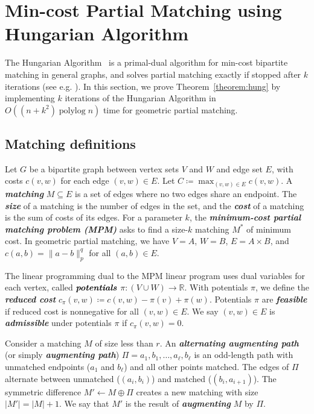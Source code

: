 \documentclass[a4paper,UKenglish]{socg-lipics-v2018}
\def\polylog{\mathop{\mathrm{polylog}}}
\def\reals{\mathbb{R}}
\def\abs#1{\mathopen| #1 \mathclose|}		%
\def\norm#1{\mathopen\| #1 \mathclose\|}	%
\theoremstyle{plain}
\numberwithin{figure}{section}
\def\EMPH#1{\textbf{\emph{\boldmath #1}}}
\begin{document}
\section{Min-cost Partial Matching using Hungarian Algorithm}
\label{section:hung}

The Hungarian Algorithm~\cite{Kuhn55} is a primal-dual algorithm for min-cost
bipartite matching in general graphs, and solves partial matching exactly if
stopped after $k$ iterations (see e.g. \cite{RT12}).
In this section, we prove Theorem~\ref{theorem:hung} by implementing $k$
iterations of the Hungarian Algorithm in $O((n + k^2)\polylog n)$ time for
geometric partial matching.

\subsection{Matching definitions}

Let $G$ be a bipartite graph between vertex sets $V$ and $W$ and edge set $E$,
with costs $c(v, w)$ for each edge $(v, w) \in E$.
Let $C \coloneqq \max_{(v, w) \in E} c(v, w)$.
A \EMPH{matching} $M \subseteq E$ is a set of edges where no two edges share an
endpoint.
The \EMPH{size} of a matching is the number of edges in the set, and the
\EMPH{cost} of a matching is the sum of costs of its edges.
For a parameter $k$, the \EMPH{minimum-cost partial matching problem (MPM)}
asks to find a size-$k$ matching $M^*$ of minimum cost.
In geometric partial matching, we have $V = A$, $W = B$, $E = A \times B$,
and $c(a, b) = \norm{a-b}_p^q$ for all $(a, b) \in E$.

The linear programming dual to the MPM linear program uses dual variables for
each vertex, called $\EMPH{potentials}$ $\pi: (V\cup W) \to \reals$.
With potentials $\pi$, we define the \EMPH{reduced cost}
$c_\pi(v, w) \coloneqq c(v, w) - \pi(v) + \pi(w)$.
Potentials $\pi$ are \EMPH{feasible} if reduced cost is nonnegative for all
$(v, w) \in E$.
We say $(v, w) \in E$ is \EMPH{admissible} under potentials $\pi$ if
$c_\pi(v, w) = 0$.

Consider a matching $M$ of size less than $r$.
An \EMPH{alternating augmenting path} (or simply \EMPH{augmenting path})
$\Pi = a_1, b_1, \ldots, a_\ell, b_\ell$ is an odd-length path with unmatched
endpoints ($a_1$ and $b_\ell$) and all other points matched.
The edges of $\Pi$ alternate between unmatched ($(a_i, b_i)$) and matched
($(b_i, a_{i+1})$).
The symmetric difference $M' \gets M \oplus \Pi$ creates a new matching with
size $\abs{M'} = \abs{M}+1$.
We say that $M'$ is the result of \EMPH{augmenting} $M$ by $\Pi$.
\end{document}
